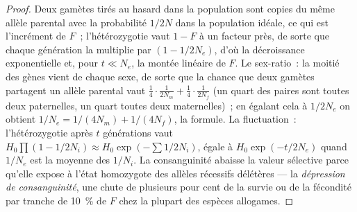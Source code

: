 \begin{proof}
Deux gamètes tirés au hasard dans la population sont copies du même
allèle parental avec la probabilité $1/2N$ dans la population idéale, ce
qui est l'incrément de $F$~; l'hétérozygotie vaut $1 - F$ à un facteur
près, de sorte que chaque génération la multiplie par $(1 - 1/2N_{e})$,
d'où la décroissance exponentielle et, pour $t \ll N_{e}$, la montée
linéaire de $F$. Le sex-ratio~: la moitié des gènes vient de chaque
sexe, de sorte que la chance que deux gamètes partagent un allèle
parental vaut $\tfrac{1}{4}\cdot\tfrac{1}{2N_{m}} +
\tfrac{1}{4}\cdot\tfrac{1}{2N_{f}}$ (un quart des paires sont toutes
deux paternelles, un quart toutes deux maternelles)~; en égalant cela à
$1/2N_{e}$ on obtient $1/N_{e} = 1/(4N_{m}) + 1/(4N_{f})$, la formule.
La fluctuation~: l'hétérozygotie après $t$ générations vaut
$H_{0}\prod(1 - 1/2N_{i})
\approx H_{0}\exp(-\sum 1/2N_{i})$, égale à $H_{0}\exp(-t/2N_{e})$ quand
$1/N_{e}$ est la moyenne des $1/N_{i}$. La consanguinité abaisse la
valeur sélective parce qu'elle expose à l'état homozygote des allèles
récessifs délétères --- la \emph{dépression de consanguinité}, une chute
de plusieurs pour cent de la survie ou de la fécondité par tranche de
\qty{10}{\%} de $F$ chez la plupart des espèces allogames.
\end{proof}

